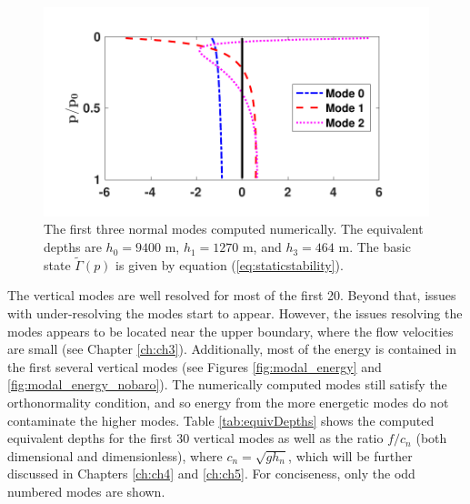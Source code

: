 \begin{figure}[H]
\includegraphics[scale=1]{./Chapter2/img/normalmodes}
\caption{The first three normal modes computed numerically. The equivalent depths are $h_0 = 9400$ m, $h_1 = 1270$ m, and $h_3 = 464$ m. The basic state $\tilde{\Gamma}(p)$ is given by equation (\ref{eq:staticstability}).}
\label{fig:normalmodes}
\end{figure}

The vertical modes are well resolved for most of the first 20. Beyond that, issues with under-resolving the modes start to appear. However, the issues resolving the modes appears to be located near the upper boundary, where the flow velocities are small (see Chapter \ref{ch:ch3}). Additionally, most of the energy is contained in the first several vertical modes (see Figures \ref{fig:modal_energy} and \ref{fig:modal_energy_nobaro}). The numerically computed modes still satisfy the orthonormality condition, and so energy from the more energetic modes do not contaminate the higher modes. Table \ref{tab:equivDepths} shows the computed equivalent depths for the first 30 vertical modes as well as the ratio $f/c_n$ (both dimensional and dimensionless), where $c_n = \sqrt{gh_n}$, which will be further discussed in Chapters \ref{ch:ch4} and \ref{ch:ch5}. For conciseness, only the odd numbered modes are shown. \\

